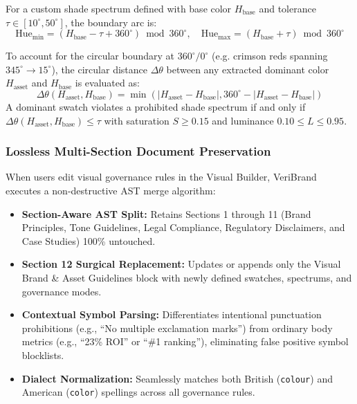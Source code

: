 \documentclass[11pt,a4paper]{article}
\begin{document}
For a custom shade spectrum defined with base color $H_{\text{base}}$ and tolerance $\tau \in [10^\circ, 50^\circ]$, the boundary arc is:
\begin{equation}
    \text{Hue}_{\text{min}} = (H_{\text{base}} - \tau + 360^\circ) \bmod 360^\circ, \quad \text{Hue}_{\text{max}} = (H_{\text{base}} + \tau) \bmod 360^\circ
\end{equation}

To account for the circular boundary at $360^\circ / 0^\circ$ (e.g. crimson reds spanning $345^\circ \to 15^\circ$), the circular distance $\Delta \theta$ between any extracted dominant color $H_{\text{asset}}$ and $H_{\text{base}}$ is evaluated as:
\begin{equation}
    \Delta \theta(H_{\text{asset}}, H_{\text{base}}) = \min\left(|H_{\text{asset}} - H_{\text{base}}|, 360^\circ - |H_{\text{asset}} - H_{\text{base}}|\right)
\end{equation}
A dominant swatch violates a prohibited shade spectrum if and only if $\Delta \theta(H_{\text{asset}}, H_{\text{base}}) \le \tau$ with saturation $S \ge 0.15$ and luminance $0.10 \le L \le 0.95$.

\subsubsection{Lossless Multi-Section Document Preservation}
When users edit visual governance rules in the Visual Builder, VeriBrand executes a non-destructive AST merge algorithm:
\begin{itemize}[leftmargin=1cm]
    \item \textbf{Section-Aware AST Split:} Retains Sections 1 through 11 (Brand Principles, Tone Guidelines, Legal Compliance, Regulatory Disclaimers, and Case Studies) 100\% untouched.
    \item \textbf{Section 12 Surgical Replacement:} Updates or appends only the Visual Brand \& Asset Guidelines block with newly defined swatches, spectrums, and governance modes.
    \item \textbf{Contextual Symbol Parsing:} Differentiates intentional punctuation prohibitions (e.g., ``No multiple exclamation marks'') from ordinary body metrics (e.g., ``23\% ROI'' or ``\#1 ranking''), eliminating false positive symbol blocklists.
    \item \textbf{Dialect Normalization:} Seamlessly matches both British (\texttt{colour}) and American (\texttt{color}) spellings across all governance rules.
\end{itemize}
\end{document}
